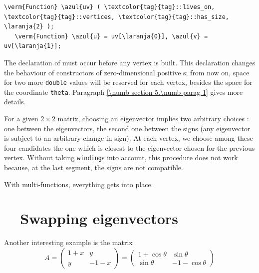 \begin{Verbatim}[commandchars=\\\{\},formatcom=\small\tt,frame=single,
   label=parag-\ref{\numb section 7.\numb parag 26}.cpp,rulecolor=\color{moldura},
   baselinestretch=0.94,framesep=2mm                                              ]
   \verm{Function} \azul{uv} ( \textcolor{tag}{tag}::lives_on, \textcolor{tag}{tag}::vertices, \textcolor{tag}{tag}::has_size, \laranja{2} );
   \verm{Function} \azul{u} = uv[\laranja{0}], \azul{v} = uv[\laranja{1}];
\end{Verbatim}

The declaration of {\small\tt{}} must occur before any vertex is built.
This declaration changes the behaviour of constructors of zero-dimensional positive
{\small\tt{}}s;
from now on, space for two more {\small\tt double} values will be reserved for each vertex,
besides the space for the coordinate {\small\tt theta}.
Paragraph \ref{\numb section 5.\numb parag 1} gives more details.

For a given $ 2\times 2 $ matrix, choosing an eigenvector implies two arbitrary choices :
one between the eigenvectors, the second one between the signs
(any eigenvector is subject to an arbitrary change in sign).
At each vertex, we choose among these four candidates
the one which is closest to the eigenvector chosen for the previous vertex.
Without taking {\small\tt winding}s into account, this procedure does not work because,
at the last segment, the signs are not compatible.

With multi-functions, everything gets into place.


\section{~~Swapping eigenvectors}  \label{\numb section 7.\numb parag 27}

Another interesting example is the matrix
$$ A = \left(\begin{array}{cc} 1+x & y \\ y & -1-x \end{array}\right)
= \left(\begin{array}{cc} 1+\cos\theta & \sin\theta \\ \sin\theta & -1-\cos\theta \end{array}\right) $$

